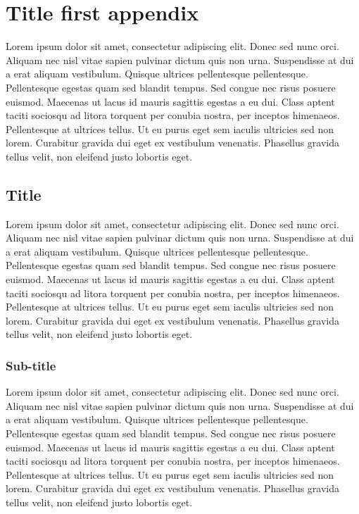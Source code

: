 \chapter{Title first appendix}\label{attachment:a}

Lorem ipsum dolor sit amet, consectetur adipiscing elit. Donec sed nunc orci.
Aliquam nec nisl vitae sapien pulvinar dictum quis non urna. Suspendisse at dui a
erat aliquam vestibulum. Quisque ultrices pellentesque pellentesque. Pellentesque
egestas quam sed blandit tempus. Sed congue nec risus posuere euismod. Maecenas ut
lacus id mauris sagittis egestas a eu dui. Class aptent taciti sociosqu ad
litora torquent per conubia nostra, per inceptos himenaeos. Pellentesque at
ultrices tellus. Ut eu purus eget sem iaculis ultricies sed non lorem. Curabitur
gravida dui eget ex vestibulum venenatis. Phasellus gravida tellus velit, non
eleifend justo lobortis eget.

\section{Title}
Lorem ipsum dolor sit amet, consectetur adipiscing elit. Donec sed nunc orci. Aliquam
nec nisl vitae sapien pulvinar dictum quis non urna. Suspendisse at dui a erat
aliquam vestibulum. Quisque ultrices pellentesque pellentesque. Pellentesque
egestas quam sed blandit tempus. Sed congue nec risus posuere euismod. Maecenas
ut lacus id mauris sagittis egestas a eu dui. Class aptent taciti sociosqu ad litora
torquent per conubia nostra, per inceptos himenaeos. Pellentesque at ultrices tellus.
Ut eu purus eget sem iaculis ultricies sed non lorem. Curabitur gravida dui eget
ex vestibulum venenatis. Phasellus gravida tellus velit, non eleifend justo lobortis
eget.

\subsection{Sub-title}
Lorem ipsum dolor sit amet, consectetur adipiscing elit. Donec sed nunc orci.
Aliquam nec nisl vitae sapien pulvinar dictum quis non urna. Suspendisse at dui a
erat aliquam vestibulum. Quisque ultrices pellentesque pellentesque. Pellentesque
egestas quam sed blandit tempus. Sed congue nec risus posuere euismod. Maecenas ut
lacus id mauris sagittis egestas a eu dui. Class aptent taciti sociosqu ad
litora torquent per conubia nostra, per inceptos himenaeos. Pellentesque at
ultrices tellus. Ut eu purus eget sem iaculis ultricies sed non lorem. Curabitur
gravida dui eget ex vestibulum venenatis. Phasellus gravida tellus velit, non
eleifend justo lobortis eget.
